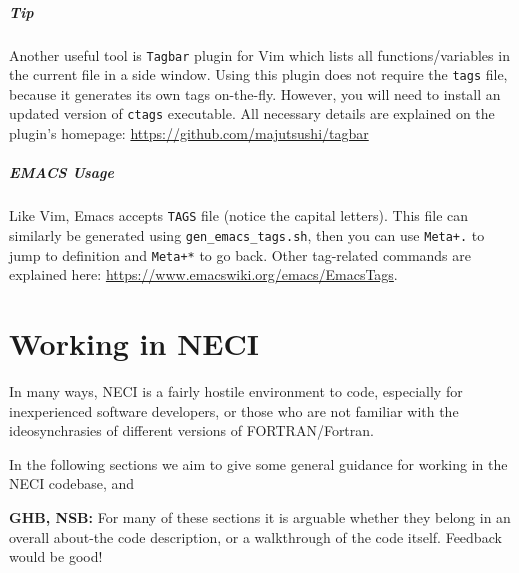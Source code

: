 \documentclass[a4paper,notitlepage]{scrreprt}
\let\code\lstinline
\begin{document}
\paragraph{Tip} Another useful tool is \code{Tagbar} plugin for Vim which lists all functions/variables in the current file in a side window. Using this plugin does not require the \code{tags} file, because it generates its own tags on-the-fly. However, you will need to install an updated version of \code{ctags} executable. All necessary details are explained on the plugin's homepage: \url{https://github.com/majutsushi/tagbar}


\paragraph{EMACS Usage}
Like Vim, Emacs accepts  \code{TAGS} file (notice the capital letters).
This file can similarly be generated using \code{gen_emacs_tags.sh}, then you can use \code{Meta+.} to jump to definition and \code{Meta+*} to go back. Other tag-related commands are explained here: \url{https://www.emacswiki.org/emacs/EmacsTags}.

\chapter{Working in NECI}
In many ways, NECI is a fairly hostile environment to code, especially for
inexperienced software developers, or those who are not familiar with the
ideosynchrasies of different versions of FORTRAN/Fortran.

In the following sections we aim to give some general guidance for working in
the NECI codebase, and

\textbf{GHB, NSB:} For many of these sections it is arguable whether they
belong in an overall about-the code description, or a walkthrough of the code
itself. Feedback would be good!
\end{document}
